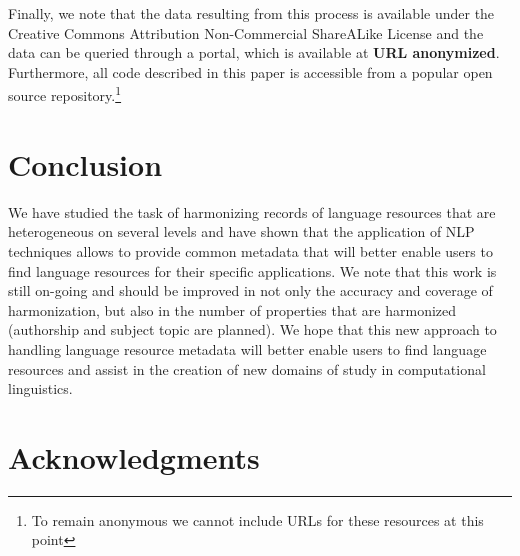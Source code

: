 \documentclass[11pt]{article}
\begin{document}
Finally, we note that the data resulting from this process is available under
the Creative Commons Attribution Non-Commercial ShareALike License and the data
can be queried through a portal, which is available at \textbf{URL anonymized}.
Furthermore, all code described in this paper is accessible from a popular open
source repository.\footnote{To remain anonymous we cannot include URLs for these
resources at this point}

\section{Conclusion}

We have studied the task of harmonizing records of language resources that are
heterogeneous on several levels and have shown that the application of NLP
techniques allows to provide common metadata that will better enable users to
find language resources for their specific applications. We note that this work
is still on-going and should be improved in not only the accuracy and coverage
of harmonization, but also in the number of properties that are harmonized
(authorship and subject topic are planned). We hope that this new approach to
handling language resource metadata will better enable users to find language
resources and assist in the creation of new domains of study in computational
linguistics.

\section*{Acknowledgments}

%



\end{document}
